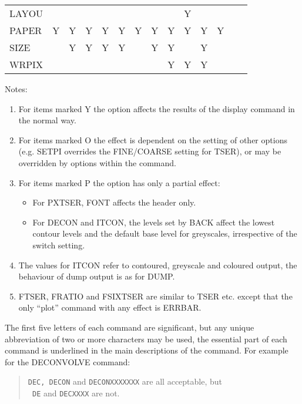\begin{table}
{\begin{center}
\begin{tabular}{|l|*{7}{c}|*{4}{c}|*{2}{c}|}
LAYOU & & & & & & & & & Y & & & & \\ 
PAPER & Y & Y & Y & Y & Y & Y & Y & Y & Y & Y & Y & & \\ 
SIZE & & Y & Y & Y & Y & & Y & Y & & Y & & & \\ 
WRPIX & & & & & & & & Y & Y & Y & & & \\
\hline
\end{tabular}
\end{center}
Notes:
\begin{enumerate}
\item For items marked Y the option affects the results of the display command
in the normal way.
\item For items marked O the effect is dependent on the setting of other
options (e.g. SETPI overrides the FINE/COARSE setting for TSER), or may
be overridden by options within the command.
\item For items marked P the option has only a partial effect:
\begin{itemize}
\item For PXTSER, FONT affects the header only.
\item For DECON and ITCON, the levels set by BACK affect the lowest contour
levels and the default base level for greyscales, irrespective of the
switch setting.
\end{itemize}
\item The values for ITCON refer to contoured, greyscale and coloured output,
the behaviour of dump output is as for DUMP.
\item FTSER, FRATIO and FSIXTSER are similar to TSER etc. except that the only
``plot'' command with any effect is ERRBAR.
\end{enumerate}}
\end{table}

The first five letters of each command are significant, but any unique
abbreviation of two or more characters may be used, the essential part
of each command is underlined in the main descriptions of the command.
For example for the DECONVOLVE command:
\begin{quote}
{\tt DEC, DECON} and {\tt DECONXXXXXXX} are all acceptable, but\\ {\tt
DE} and {\tt DECXXXX} are not.
\end{quote}

